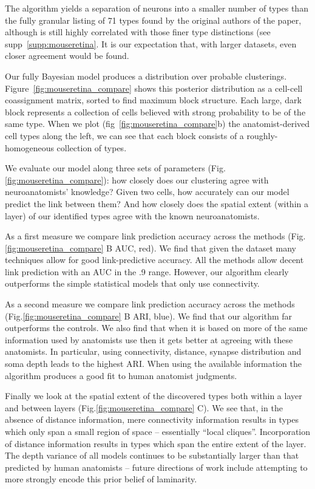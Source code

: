 \documentclass{article}
\begin{document}
The algorithm yields a separation of neurons into a smaller number of
types than the fully granular listing of 71 types found by the
original authors of the paper, although is still highly correlated
with those finer type distinctions (see
supp~\ref{supp:mouseretina}. It is our expectation that, with larger
datasets, even closer agreement would be found.

Our fully Bayesian model produces a distribution over probable
clusterings.  Figure~\ref{fig:mouseretina_compare} shows this
posterior distribution as a cell-cell coassignment matrix, sorted to
find maximum block structure. Each large, dark block represents a
collection of cells believed with strong probability to be of the same
type. When we plot (fig~\ref{fig:mouseretina_compare}b) the
anatomist-derived cell types along the left, we can see that each
block consists of a roughly-homogeneous collection of types. 

We evaluate our model along three sets of parameters
(Fig.\ref{fig:mouseretina_compare}): how closely does our clustering agree
with neuroanatomists' knowledge?  Given two cells, how accurately can
our model predict the link between them? And how closely does the
spatial extent (within a layer) of our identified types agree with the
known neuroanatomists.

As a first measure we compare link prediction accuracy across the
methods (Fig.\ref{fig:mouseretina_compare} B AUC, red).  We find that
given the dataset many techniques allow for good link-predictive
accuracy. All the methods allow decent link prediction with an AUC in
the .9 range. However, our algorithm clearly outperforms the simple
statistical models that only use connectivity.

As a second measure we compare link prediction accuracy across the
methods (Fig.\ref{fig:mouseretina_compare} B ARI, blue). We find that our
algorithm far outperforms the controls. We also find that when it is
based on more of the same information used by anatomists use then it
gets better at agreeing with these anatomists. In particular, using
connectivity, distance, synapse distribution and soma depth leads to
the highest ARI. When using the available information the algorithm
produces a good fit to human anatomist judgments.

Finally we look at the spatial extent of the discovered types both
within a layer and between layers (Fig.\ref{fig:mouseretina_compare}
C). We see that, in the absence of distance information, mere
connectivity information results in types which only span a small
region of space -- essentially “local cliques”. Incorporation of
distance information results in types which span the entire extent of
the layer. The depth variance of all models continues to be
substantially larger than that predicted by human anatomists -- future
directions of work include attempting to more strongly encode this
prior belief of laminarity.
\end{document}
